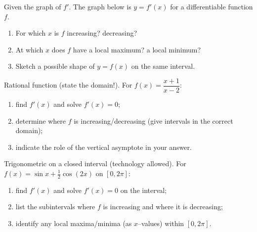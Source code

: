 \documentclass[11pt]{article}
\def\textbf#1{#1}%
\newcounter{question}
\begin{document}
\begin{question}
\textbf{Given the graph of $f'$.}
The graph below is $y=f'(x)$ for a differentiable function $f$.
\begin{enumerate}
  \item For which $x$ is $f$ increasing? decreasing?
  \item At which $x$ does $f$ have a local maximum? a local minimum?
  \item Sketch a possible shape of $y=f(x)$ on the same interval.
\end{enumerate}

\begin{center}
\end{center}
\end{question}

\begin{question}
\textbf{Rational function (state the domain!).}
For $f(x)=\dfrac{x+1}{x-2}$:
\begin{enumerate}
  \item find $f'(x)$ and solve $f'(x)=0$;
  \item determine where $f$ is increasing/decreasing (give intervals in the correct domain);
  \item indicate the role of the vertical asymptote in your answer.
\end{enumerate}
\end{question}

\begin{question}
\textbf{Trigonometric on a closed interval (technology allowed).}
For $f(x)=\sin x+\tfrac12\cos(2x)$ on $[0,2\pi]$:
\begin{enumerate}
  \item find $f'(x)$ and solve $f'(x)=0$ on the interval;
  \item list the subintervals where $f$ is increasing and where it is decreasing;
  \item identify any local maxima/minima (as $x$–values) within $[0,2\pi]$.
\end{enumerate}
\end{question}
\end{document}
